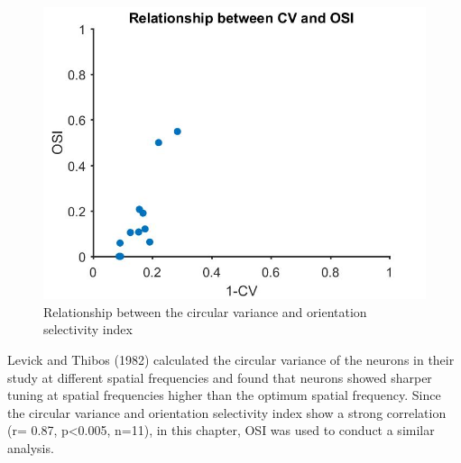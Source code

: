 		\begin{figure}[]
		\includegraphics[width=\linewidth]{superiorcolliculus/CVvsOSI.jpg}
		\caption{Relationship between the circular variance and
			orientation selectivity index}
		\label{fig:CVvOSI}			
	\end{figure}
	
	Levick and Thibos (1982) calculated the circular variance of the neurons
	in their study at different spatial frequencies and found that neurons
	showed sharper tuning at spatial frequencies higher than the optimum
	spatial frequency. Since the circular variance and orientation
	selectivity index show a strong correlation (r= 0.87, p\textless{}0.005,
	n=11), in this chapter, OSI was used to conduct a similar analysis.
	
